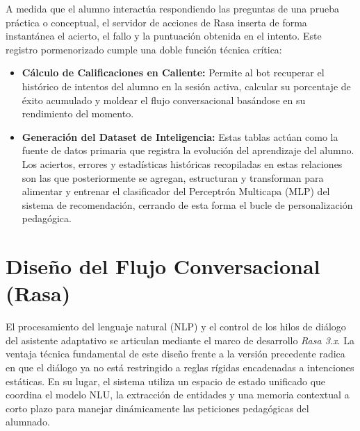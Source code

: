 \documentclass[a4paper,12pt,twoside,final]{book}
\begin{document}
A medida que el alumno interactúa respondiendo las preguntas de una prueba práctica o conceptual, el servidor de acciones de Rasa inserta de forma instantánea el acierto, el fallo y la puntuación obtenida en el intento. Este registro pormenorizado cumple una doble función técnica crítica:
\begin{itemize}
    \item \textbf{Cálculo de Calificaciones en Caliente:} Permite al bot recuperar el histórico de intentos del alumno en la sesión activa, calcular su porcentaje de éxito acumulado y moldear el flujo conversacional basándose en su rendimiento del momento.
    
    \item \textbf{Generación del Dataset de Inteligencia:} Estas tablas actúan como la fuente de datos primaria que registra la evolución del aprendizaje del alumno. Los aciertos, errores y estadísticas históricas recopiladas en estas relaciones son las que posteriormente se agregan, estructuran y transforman para alimentar y entrenar el clasificador del Perceptrón Multicapa (MLP) del sistema de recomendación, cerrando de esta forma el bucle de personalización pedagógica.
\end{itemize}

\section{Diseño del Flujo Conversacional (Rasa)}
\label{sec:diseno_conversacional}

El procesamiento del lenguaje natural (NLP) y el control de los hilos de diálogo del asistente adaptativo se articulan mediante el marco de desarrollo \textit{Rasa 3.x}. La ventaja técnica fundamental de este diseño frente a la versión precedente radica en que el diálogo ya no está restringido a reglas rígidas encadenadas a intenciones estáticas. En su lugar, el sistema utiliza un espacio de estado unificado que coordina el modelo NLU, la extracción de entidades y una memoria contextual a corto plazo para manejar dinámicamente las peticiones pedagógicas del alumnado.
\end{document}
